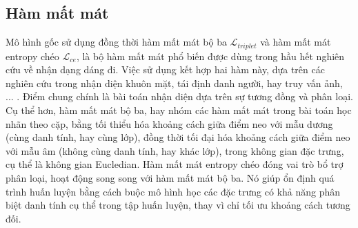 



\subsection{Hàm mất mát}

Mô hình \cite{hstl} gốc sử dụng đồng thời hàm mất mát bộ ba $\mathcal{L}_{triplet}$ \cite{triplet} và hàm mất mát entropy chéo $\mathcal{L}_{ce}$, là bộ hàm mất mát phổ biến được dùng trong hầu hết nghiên cứu về nhận dạng dáng đi. Việc sử dụng kết hợp hai hàm này, dựa trên các nghiên cứu trong nhận diện khuôn mặt, tái định danh người, hay truy vấn ảnh, ... . Điểm chung chính là bài toán nhận diện dựa trên sự tương đồng và phân loại. Cụ thể hơn, hàm mất mát bộ ba, hay nhóm các hàm mất mát trong bài toán học nhãn theo cặp, bằng tối thiểu hóa khoảng cách giữa điểm neo với mẫu dương (cùng danh tính, hay cùng lớp), đồng thời tối đại hóa khoảng cách giữa điểm neo với mẫu âm (không cùng danh tính, hay khác lớp), trong không gian đặc trưng, cụ thể là không gian Eucledian. Hàm mất mát entropy chéo đóng vai trò bổ trợ phân loại, hoạt động song song với hàm mất mát bộ ba. Nó giúp ổn định quá trình huấn luyện bằng cách buộc mô hình học các đặc trưng có khả năng phân biệt danh tính cụ thể trong tập huấn luyện, thay vì chỉ tối ưu khoảng cách tương đối.

